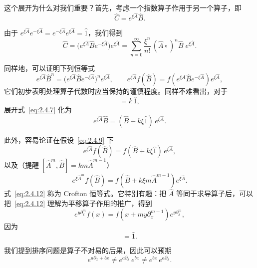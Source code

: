 这个展开为什么对我们重要？首先，考虑一个指数算子作用于另一个算子，即
\begin{equation}
\hat{C}=e^{\xi\hat{A}}\hat{B}.
\label{eq:2.4.6}
\end{equation}

由于 $e^{\xi\hat{A}}e^{-\xi\hat{A}}=e^{-\xi\hat{A}}e^{\xi\hat{A}}=\hat{1}$，我们得到
\begin{equation}
\hat{C}=\bigl(e^{\xi\hat{A}}\hat{B}e^{-\xi\hat{A}}\bigr)e^{\xi\hat{A}}
=\sum_{n=0}^{\infty}\frac{\xi^{n}}{n!}\,(\hat{A}\circ)^{n}\hat{B}\;e^{\xi\hat{A}}.
\label{eq:2.4.7}
\end{equation}

同样地，可以证明下列恒等式
\begin{equation}
e^{\xi\hat{A}}\hat{B}^{n}
=\bigl(e^{\xi\hat{A}}\hat{B}e^{-\xi\hat{A}}\bigr)^{n}e^{\xi\hat{A}},\qquad
e^{\xi\hat{A}}f(\hat{B})
=f\!\left(e^{\xi\hat{A}}\hat{B}e^{-\xi\hat{A}}\right)e^{\xi\hat{A}},
\label{eq:2.4.8}
\end{equation}
它们初步表明处理算子代数时应当保持的谨慎程度。同样不难看出，对于
\begin{equation}
[\hat{A},\hat{B}]=k\,\hat{1},
\label{eq:2.4.9}
\end{equation}
展开式~\eqref{eq:2.4.7} 化为
\begin{equation}
e^{\xi\hat{A}}\hat{B}=(\hat{B}+k\xi\hat{1})\,e^{\xi\hat{A}}.
\label{eq:2.4.10}
\end{equation}

此外，容易论证在假设~\eqref{eq:2.4.9} 下
\begin{equation}
e^{\xi\hat{A}}f(\hat{B})
=f(\hat{B}+k\xi\hat{1})\,e^{\xi\hat{A}},
\label{eq:2.4.11}
\end{equation}
以及（提醒 $[\hat{A}^{m},\hat{B}]=km\hat{A}^{m-1}$）
\begin{equation}
e^{\xi\hat{A}^{m}}f(\hat{B})
=f\!\left(\hat{B}+k\xi m\hat{A}^{m-1}\right)e^{\xi\hat{A}}.
\label{eq:2.4.12}
\end{equation}
式~\eqref{eq:2.4.12} 称为 Crofton 恒等式。它特别有趣：把 $\hat{A}$ 等同于求导算子后，可以把~\eqref{eq:2.4.12} 理解为平移算子作用的推广，得到
\begin{equation}
e^{y\partial_{x}^{m}}f(x)
=f\!\left(x+my\partial_{x}^{m-1}\right)e^{y\partial_{x}^{m}},
\label{eq:2.4.13}
\end{equation}
因为
\begin{equation}
[\partial_{x},x]=\hat{1}.
\label{eq:2.4.14}
\end{equation}

我们提到排序问题是算子不对易的后果，因此可以预期
\begin{equation}
e^{a\partial_{x}+b x}\neq e^{a\partial_{x}}\,e^{b x}
\neq e^{b x}\,e^{a\partial_{x}}.
\label{eq:2.4.15}
\end{equation}


